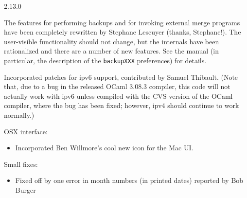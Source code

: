 \begin{changesfromversion}{2.13.0}
\item The features for performing backups and for invoking external merge
programs have been completely rewritten by Stephane Lescuyer (thanks,
Stephane!).  The user-visible functionality should not change, but the
internals have been rationalized and there are a number of new features.
See the manual (in particular, the description of the \verb|backupXXX|
preferences) for details.

\item Incorporated patches for ipv6 support, contributed by Samuel Thibault.
(Note that, due to a bug in the released OCaml 3.08.3 compiler, this code
will not actually work with ipv6 unless compiled with the CVS version of the
OCaml compiler, where the bug has been fixed; however, ipv4 should continue
to work normally.)

\item OSX interface:
\begin{itemize}
\item Incorporated Ben Willmore's cool new icon for the Mac UI.
\end{itemize}

\item Small fixes:
\begin{itemize}
\item Fixed off by one error in month numbers (in printed dates) reported 
  by Bob Burger
\end{itemize}

\end{changesfromversion}

